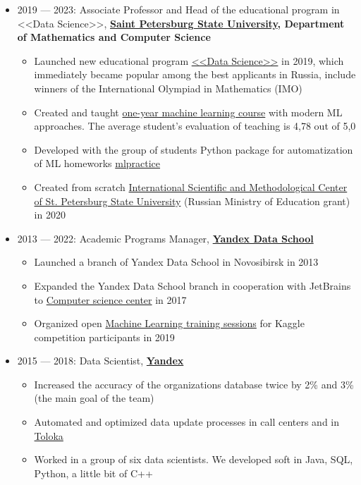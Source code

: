 \documentclass[11pt]{article}
\begin{document}
\begin{itemize}
 \item 2019 — 2023:
 Associate Professor and Head of the educational program in <<Data Science>>,  \textbf{\href{https://english.spbu.ru/}{Saint Petersburg State University}, Department of Mathematics and Computer Science}
 \begin{itemize}
	 \item Launched new educational program \href{https://maad.compscicenter.ru}{<<Data Science>>} in 2019, which immediately became popular among the best applicants in Russia, include winners of the International Olympiad in Mathematics (IMO)
	 \item Created and taught \href{https://github.com/spbu-math-cs/ml-course/}{one-year machine learning course} with modern ML approaches. The average student's evaluation of teaching is 4,78 out of 5,0
	 \item Developed with the group of students Python package for automatization of ML homeworks \href{https://github.com/avalur/mlpractice}{mlpractice}
	 \item Created from scratch \href{https://gsom.spbu.ru/all_news/event2020-11-28/}{International Scientific and Methodological Center of St. Petersburg State University} (Russian Ministry of Education grant) in 2020
 \end{itemize}

  \item 2013 — 2022:
	Academic Programs Manager, \textbf{\href{https://academy.yandex.ru/dataschool/}{Yandex Data School}}
	\begin{itemize}
		\item Launched a branch of Yandex Data School in Novosibirsk in 2013
		\item Expanded the Yandex Data School branch in cooperation with JetBrains to \href{https://compscicenter.ru}{Computer science center} in 2017
		\item Organized open \href{https://habr.com/ru/company/JetBrains-education/blog/458042/}{Machine Learning training sessions} for Kaggle competition participants in 2019
	\end{itemize}

  \item 2015 — 2018:
	Data Scientist, \textbf{\href{https://ya.ru/}{Yandex}}
	\begin{itemize}
		\item Increased the accuracy of the organizations database twice by 2\% and 3\% (the main goal of the team)
		\item Automated and optimized data update processes in call centers and in \href{https://toloka.ai/}{Toloka}
		\item Worked in a group of six data scientists. We developed soft in Java, SQL, Python, a little bit of C++
	\end{itemize}


\end{itemize}
\end{document}
